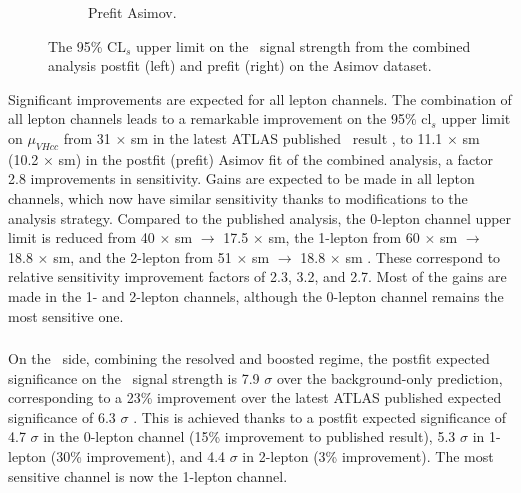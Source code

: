 \begin{figure}[h!]
\begin{subfigure}[b]{0.48\textwidth}
      \caption{Prefit Asimov.}
      \label{fig:fit_new_vhcclimitPrefit}
  \end{subfigure}
    \caption{The 95\% CL$_s$ upper limit on the \vhc\ signal strength from the combined analysis postfit (left) and prefit (right) on the Asimov dataset.}
    \label{fig:fit_vhcc_limits}
\end{figure} 

Significant improvements are expected for all lepton channels. The combination of all lepton channels leads to a remarkable improvement on the 95\% \gls{cl}$_s$ upper limit on $\mu_{VHcc}$ from 31 $\times$ \gls{sm} in the latest ATLAS published \vhc\ result \cite{Collaboration:2721696}, to 11.1 $\times$ \gls{sm} (10.2 $\times$ \gls{sm}) in the postfit (prefit) Asimov fit of the combined analysis, a factor 2.8 improvements in sensitivity. Gains are expected to be made in all lepton channels, which now have similar sensitivity thanks to modifications to the analysis strategy. Compared to the published analysis, the 0-lepton channel upper limit is reduced from 40 $\times$ \gls{sm} $\rightarrow$ 17.5 $\times$ \gls{sm}, the 1-lepton from 60 $\times$ \gls{sm} $\rightarrow$ 18.8 $\times$ \gls{sm}, and the 2-lepton from 51 $\times$ \gls{sm} $\rightarrow$ 18.8 $\times$ \gls{sm} \cite{Collaboration:2721696}. These correspond to relative sensitivity improvement factors of 2.3, 3.2, and 2.7. Most of the gains are made in the 1- and 2-lepton channels, although the 0-lepton channel remains the most sensitive one.

\subsubsection{\boldvhb}
On the \vhb\ side, combining the resolved and boosted regime, the postfit expected significance on the \vhb\ signal strength is 7.9 $\sigma$ over the background-only prediction, corresponding to a 23\% improvement over the latest ATLAS published expected significance of 6.3 $\sigma$ \cite{ATLAS:2021wqh}. This is achieved thanks to a postfit expected significance of 4.7 $\sigma$ in the 0-lepton channel (15\% improvement to published result), 5.3 $\sigma$ in 1-lepton (30\% improvement), and 4.4 $\sigma$ in 2-lepton (3\% improvement). The most sensitive channel is now the 1-lepton channel. \\

